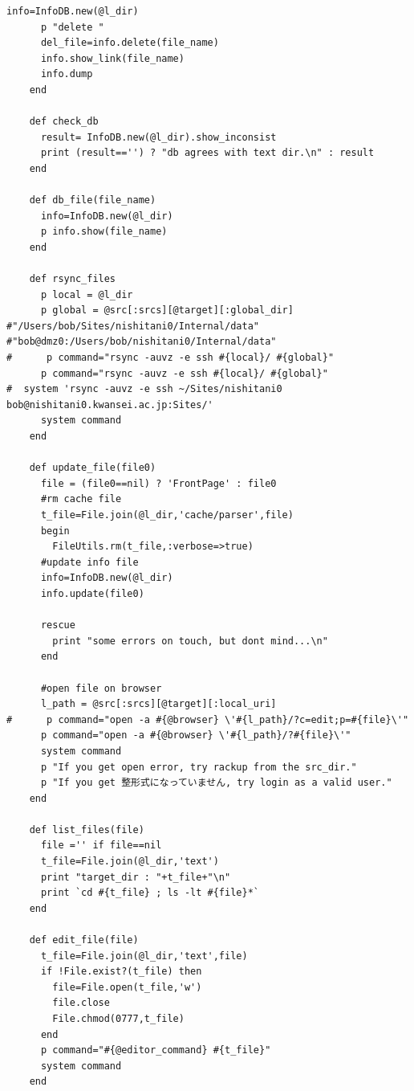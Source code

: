 \begin{lstlisting}[style=customRuby]
      info=InfoDB.new(@l_dir)
      p "delete "
      del_file=info.delete(file_name)
      info.show_link(file_name)
      info.dump
    end

    def check_db
      result= InfoDB.new(@l_dir).show_inconsist
      print (result=='') ? "db agrees with text dir.\n" : result
    end

    def db_file(file_name)
      info=InfoDB.new(@l_dir)
      p info.show(file_name)
    end

    def rsync_files
      p local = @l_dir
      p global = @src[:srcs][@target][:global_dir]
#"/Users/bob/Sites/nishitani0/Internal/data"                                 
#"bob@dmz0:/Users/bob/nishitani0/Internal/data"                              
#      p command="rsync -auvz -e ssh #{local}/ #{global}"                    
      p command="rsync -auvz -e ssh #{local}/ #{global}"
#  system 'rsync -auvz -e ssh ~/Sites/nishitani0 bob@nishitani0.kwansei.ac.jp:Sites/'                                                                    
      system command
    end

    def update_file(file0)
      file = (file0==nil) ? 'FrontPage' : file0
      #rm cache file                                                         
      t_file=File.join(@l_dir,'cache/parser',file)
      begin
        FileUtils.rm(t_file,:verbose=>true)
      #update info file                                                      
      info=InfoDB.new(@l_dir)
      info.update(file0)

      rescue
        print "some errors on touch, but dont mind...\n"
      end

      #open file on browser                                                  
      l_path = @src[:srcs][@target][:local_uri]
#      p command="open -a #{@browser} \'#{l_path}/?c=edit;p=#{file}\'"       
      p command="open -a #{@browser} \'#{l_path}/?#{file}\'"
      system command
      p "If you get open error, try rackup from the src_dir."
      p "If you get 整形式になっていません, try login as a valid user."
    end

    def list_files(file)
      file ='' if file==nil
      t_file=File.join(@l_dir,'text')
      print "target_dir : "+t_file+"\n"
      print `cd #{t_file} ; ls -lt #{file}*`
    end

    def edit_file(file)
      t_file=File.join(@l_dir,'text',file)
      if !File.exist?(t_file) then
        file=File.open(t_file,'w')
        file.close
        File.chmod(0777,t_file)
      end
      p command="#{@editor_command} #{t_file}"
      system command
    end


\end{lstlisting}
